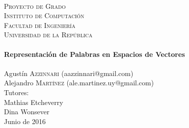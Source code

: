 \begin{titlepage}
  \begin{center}

    \textsc{\LARGE}\\[1.0cm]
    \textsc{\LARGE Proyecto de Grado}\\[1.5cm]

    \textsc{\Large Instituto de Computación}\\[0.2cm]
    \textsc{\Large Facultad de Ingeniería}\\[0.2cm]
    \textsc{\Large Universidad de la República}\\[2.0cm]

    \HRule\\[0.6cm]
    {\Huge \bfseries Representación de Palabras en Espacios de Vectores}\\[0.3cm]
    \HRule\\[2.3cm]

    {\Large Agustín \textsc{Azzinnari}} {\small (aazzinnari@gmail.com)}\\
    {\Large Alejandro \textsc{Martínez}} {\small (ale.martinez.uy@gmail.com)}\\[2.0cm]

    {\small Tutores:}\\
    {\normalsize Mathias Etcheverry}\\
    {\normalsize Dina Wonsever}\\[1.5cm]

    Junio de 2016\\

    \vfill

  \end{center}
\end{titlepage}
